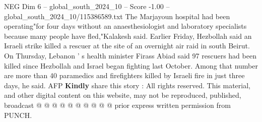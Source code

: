 \begin{textsample}{NEG Dim 6 – global\_south\_2024\_10 – Score -1.00 – global\_south\_2024\_10/115386589.txt}
The Marjayoun hospital had been operating"for four days without an anaesthesiologist and laboratory specialists because many people have fled,"Kalakesh said.
Earlier Friday, Hezbollah said an Israeli strike killed a rescuer at the site of an overnight air raid in south Beirut.
On Thursday, Lebanon ' s health minister Firass Abiad said 97 rescuers had been killed since Hezbollah and Israel began fighting last October.
Among that number are more than 40 paramedics and firefighters killed by Israeli fire in just three days, he said.
AFP \textbf{Kindly} share this story : All rights reserved.
This material, and other digital content on this website, may not be reproduced, published, broadcast @ @ @ @ @ @ @ @ @ @ prior express written permission from PUNCH.

\end{textsample}
